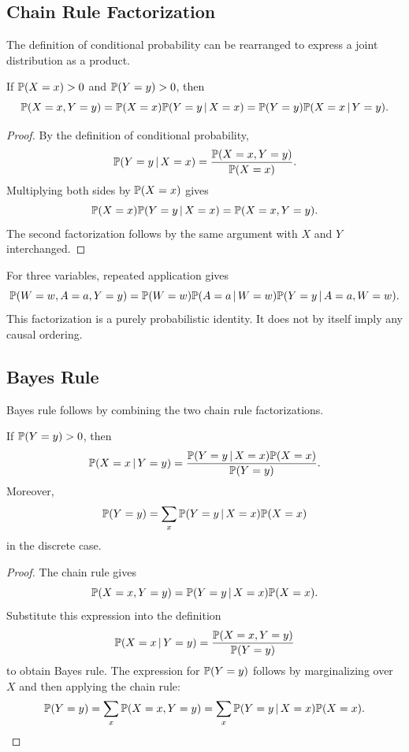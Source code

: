 \subsection{Chain Rule Factorization}

The definition of conditional probability can be rearranged to express a joint distribution as a product.

\begin{proposition}
If $\mathbb{P}(X=x)>0$ and $\mathbb{P}(Y=y)>0$, then
\[
\mathbb{P}(X=x,Y=y)
=\mathbb{P}(X=x)\mathbb{P}(Y=y\,\vert\, X=x)
=\mathbb{P}(Y=y)\mathbb{P}(X=x\,\vert\, Y=y).
\]
\end{proposition}

\begin{proof}
By the definition of conditional probability,
\[
\mathbb{P}(Y=y\,\vert\, X=x)
=\frac{\mathbb{P}(X=x,Y=y)}{\mathbb{P}(X=x)}.
\]
Multiplying both sides by $\mathbb{P}(X=x)$ gives
\[
\mathbb{P}(X=x)\mathbb{P}(Y=y\,\vert\, X=x)=\mathbb{P}(X=x,Y=y).
\]
The second factorization follows by the same argument with $X$ and $Y$ interchanged.
\end{proof}

For three variables, repeated application gives
\[
\mathbb{P}(W=w,A=a,Y=y)
=
\mathbb{P}(W=w)\mathbb{P}(A=a\,\vert\, W=w)\mathbb{P}(Y=y\,\vert\, A=a,W=w).
\]
This factorization is a purely probabilistic identity. It does not by itself imply any causal ordering.

\subsection{Bayes Rule}

Bayes rule follows by combining the two chain rule factorizations.

\begin{proposition}
If $\mathbb{P}(Y=y)>0$, then
\[
\mathbb{P}(X=x\,\vert\, Y=y)
=
\frac{\mathbb{P}(Y=y\,\vert\, X=x)\mathbb{P}(X=x)}{\mathbb{P}(Y=y)}.
\]
Moreover,
\[
\mathbb{P}(Y=y)=\sum_x \mathbb{P}(Y=y\,\vert\, X=x)\mathbb{P}(X=x)
\]
in the discrete case.
\end{proposition}

\begin{proof}
The chain rule gives
\[
\mathbb{P}(X=x,Y=y)=\mathbb{P}(Y=y\,\vert\, X=x)\mathbb{P}(X=x).
\]
Substitute this expression into the definition
\[
\mathbb{P}(X=x\,\vert\, Y=y)=\frac{\mathbb{P}(X=x,Y=y)}{\mathbb{P}(Y=y)}
\]
to obtain Bayes rule. The expression for $\mathbb{P}(Y=y)$ follows by marginalizing over $X$ and then applying the chain rule:
\[
\mathbb{P}(Y=y)
=\sum_x\mathbb{P}(X=x,Y=y)
=\sum_x\mathbb{P}(Y=y\,\vert\, X=x)\mathbb{P}(X=x).
\]
\end{proof}

